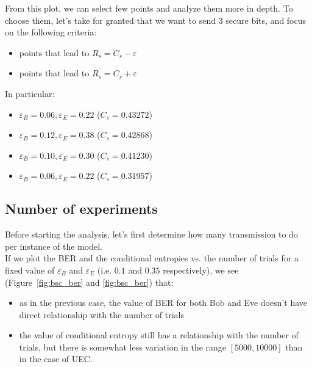 \documentclass[a4paper,12pt,titlepage]{article}
\begin{document}
From this plot, we can select few points and analyze them more in depth. To
choose them, let's take for granted that we want to send 3 secure bits, and
focus on the following criteria:
\begin{itemize}
  \item points that lead to $R_s = C_s - \varepsilon$
  \item points that lead to $R_s = C_s + \varepsilon$
\end{itemize}
In particular:
\begin{itemize}
  \item $\varepsilon_B = 0.06, \varepsilon_E = 0.22$ ($C_s = 0.43272$)
  \item $\varepsilon_B = 0.12, \varepsilon_E = 0.38$ ($C_s = 0.42868$)
  \item $\varepsilon_B = 0.10, \varepsilon_E = 0.30$ ($C_s = 0.41230$)
  \item $\varepsilon_B = 0.06, \varepsilon_E = 0.22$ ($C_s = 0.31957$)
\end{itemize}

\newpage

\subsection*{Number of experiments}
Before starting the analysis, let's first determine how many transmission to do
per instance of the model. \\
If we plot the BER and the conditional entropies vs. the number of
trials for a fixed value of $\varepsilon_B$ and $\varepsilon_E$ (i.e. $0.1$ and
$0.35$ respectively), we see (Figure~\ref{fig:bsc_ber} and
\ref{fig:bsc_ber}) that:
\begin{itemize}
  \item as in the previous case, the value of BER for both Bob and Eve doesn't
  have direct relationship with the number of trials
  \item the value of conditional entropy still has a relationship with the
  number of trials, but there is somewhat less variation in the range $[5000,
  10000]$ than in the case of UEC.
\end{itemize}
\end{document}
